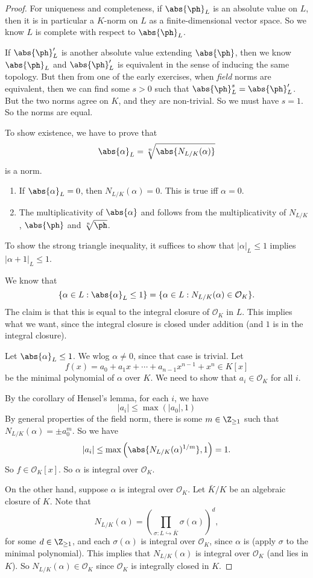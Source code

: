\documentclass[a4paper]{article}
\begin{document}
\begin{proof}
  For uniqueness and completeness, if $\abs{\ph}_L$ is an absolute value on $L$, then it is in particular a $K$-norm on $L$ as a finite-dimensional vector space. So we know $L$ is complete with respect to $\abs{\ph}_L$.

  If $\abs{\ph}_L'$ is another absolute value extending $\abs{\ph}$, then we know $\abs{\ph}_L$ and $\abs{\ph}_L'$ is equivalent in the sense of inducing the same topology. But then from one of the early exercises, when \emph{field} norms are equivalent, then we can find some $s > 0 $ such that $\abs{\ph}_L^s = \abs{\ph}_L'$. But the two norms agree on $K$, and they are non-trivial. So we must have $s = 1$. So the norms are equal.

  To show existence, we have to prove that
  \[
    \abs{\alpha}_L = \sqrt[n]{\abs{N_{L/K}(\alpha)}}
  \]
  is a norm.
  \begin{enumerate}
    \item If $\abs{\alpha}_L = 0$, then $N_{L/K}(\alpha) = 0$. This is true iff $\alpha = 0$.
    \item The multiplicativity of $\abs{\alpha}$ and follows from the multiplicativity of $N_{L/K}$, $\abs{\ph}$ and $\sqrt[n]{\ph}$.
  \end{enumerate}
  To show the strong triangle inequality, it suffices to show that $|\alpha|_L \leq 1$ implies $|\alpha + 1|_L \leq 1$.

  We know that
  \[
    \{\alpha \in L: \abs{\alpha}_L \leq 1\} = \{\alpha \in L: N_{L/K}(\alpha) \in \mathcal{O}_K\}.
  \]
  The claim is that this is equal to the integral closure of $\mathcal{O}_K$ in $L$. This implies what we want, since the integral closure is closed under addition (and $1$ is in the integral closure).

  Let $\abs{\alpha}_L \leq 1$. We wlog $\alpha \not= 0$, since that case is trivial. Let
  \[
    f(x) = a_0 + a_1x + \cdots + a_{n - 1}x^{n - 1} + x^n\in K[x]
  \]
  be the minimal polynomial of $\alpha$ over $K$. We need to show that $a_i \in \mathcal{O}_K$ for all $i$.

  By the corollary of Hensel's lemma, for each $i$, we have
  \[
    |a_i| \leq \max(|a_0|, 1)
  \]
  By general properties of the field norm, there is some $m \in \Z_{\geq 1}$ such that $N_{L/K}(\alpha) = \pm a_0^m$. So we have
  \[
    |a_i| \leq \max\left(\abs{N_{L/K}(\alpha)^{1/m}}, 1\right) = 1.
  \]
  So $f \in \mathcal{O}_K[x]$. So $\alpha$ is integral over $\mathcal{O}_K$.

  On the other hand, suppose $\alpha$ is integral over $\mathcal{O}_K$. Let $\bar{K}/K$ be an algebraic closure of $K$. Note that
  \[
    N_{L/K}(\alpha) = \left(\prod_{\sigma: L \hookrightarrow \bar{K}} \sigma(\alpha)\right)^d,
  \]
  for some $d \in \Z_{\geq 1}$, and each $\sigma(\alpha)$ is integral over $\mathcal{O}_K$, since $\alpha$ is (apply $\sigma$ to the minimal polynomial). This implies that $N_{L/K}(\alpha)$ is integral over $\mathcal{O}_K$ (and lies in $K$). So $N_{L/K}(\alpha) \in \mathcal{O}_K$ since $\mathcal{O}_K$ is integrally closed in $K$.
\end{proof}
\end{document}
